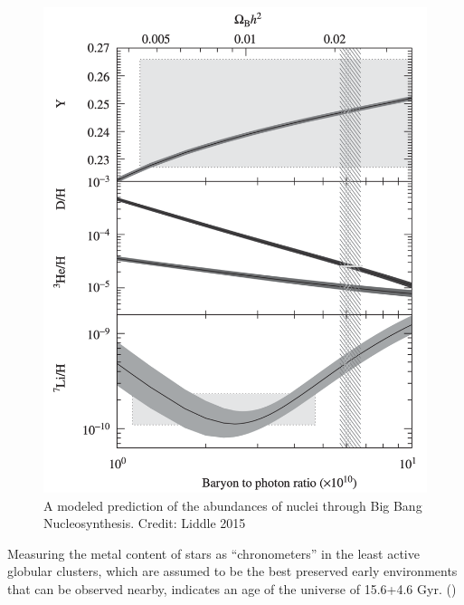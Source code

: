 \documentclass{paper}
\begin{document}
  \begin{figure}[!htb]
    \begin{centering}
    \includegraphics[scale=0.4]{BBN-ratios.pdf}
    \caption{A modeled prediction of the abundances of nuclei through Big
      Bang Nucleosynthesis.
    Credit: Liddle 2015}
    \label{fig:DE-ratios}
    \end{centering}
  \end{figure}

  Measuring the metal content of stars as ``chronometers'' in the least active 
  globular clusters, which are assumed to be the best preserved early 
  environments that can be observed nearby, indicates an age of the universe
  of 15.6+4.6 Gyr. %
  (\cite{1999ApJ...521..194C})


\end{document}

